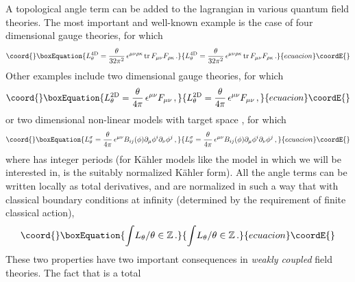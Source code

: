 \documentclass[a4paper,12pt]{article}
\def\tr{\mathop{\rm tr}\nolimits}
\def\cpN{{\mathbb C}P^{N}}
\begin{document}
\newpage\pagestyle{plain}
\baselineskip 16pt
\setcounter{footnote}{0}
%
A topological \myHighlight{$\theta$}\coordHE{} angle term \coordHE{} can be added to the 
lagrangian in 
various quantum field theories. The most important and well-known 
example is the case of four dimensional gauge theories, for which
%
\begin{equation}\coord{}\boxEquation{
\label{lt4d}
L_{\theta}^{4\rm D} ={\theta\over 32\pi^{2}}\,
\epsilon^{\mu\nu\rho\kappa}\tr F_{\mu\nu}F_{\rho\kappa}\, .
}{
L_{\theta}^{4\rm D} ={\theta\over 32\pi^{2}}\,
\epsilon^{\mu\nu\rho\kappa}\tr F_{\mu\nu}F_{\rho\kappa}\, .
}{ecuacion}\coordE{}\end{equation}
%
Other examples include two dimensional gauge theories, for which
%
\begin{equation}\coord{}\boxEquation{
\label{lt2d}
L_{\theta}^{2\rm D} ={\theta\over 4\pi}\,\epsilon^{\mu\nu}F_{\mu\nu}\, ,
}{
L_{\theta}^{2\rm D} ={\theta\over 4\pi}\,\epsilon^{\mu\nu}F_{\mu\nu}\, ,
}{ecuacion}\coordE{}\end{equation}
%
or two dimensional non-linear \myHighlight{$\sigma$}\coordHE{} models with target space \coordHE{},
for which
%
\begin{equation}\coord{}\boxEquation{
\label{lts}
L_{\theta}^{\sigma}= {\theta\over 4\pi}\, \epsilon^{\mu\nu} 
B_{ij}(\phi)\partial_{\mu}\phi^{i}\partial_{\nu}\phi^{j}\, ,
}{
L_{\theta}^{\sigma}= {\theta\over 4\pi}\, \epsilon^{\mu\nu} 
B_{ij}(\phi)\partial_{\mu}\phi^{i}\partial_{\nu}\phi^{j}\, ,
}{ecuacion}\coordE{}\end{equation}
%
where \coordHE{} has integer periods (for 
K\"ahler \myHighlight{$\sigma$}\coordHE{} models like the \myHighlight{$\cpN$}\coordHE{} model in which we will be 
interested in, \coordHE{} is the suitably normalized K\"ahler form).
All the \myHighlight{$\theta$}\coordHE{} angle terms can be written locally
as total derivatives, and are normalized in such a way that with classical 
boundary conditions at infinity (determined by the requirement of finite 
classical action),
%
\begin{equation}\coord{}\boxEquation{
\label{qc}
\int\! L_{\theta}/\theta \in {\mathbb Z}\, .
}{
\int\! L_{\theta}/\theta \in {\mathbb Z}\, .
}{ecuacion}\coordE{}\end{equation}
%
These two properties have two important consequences in {\it weakly 
coupled} field theories. The fact that \coordHE{} is a total 
\end{document}
